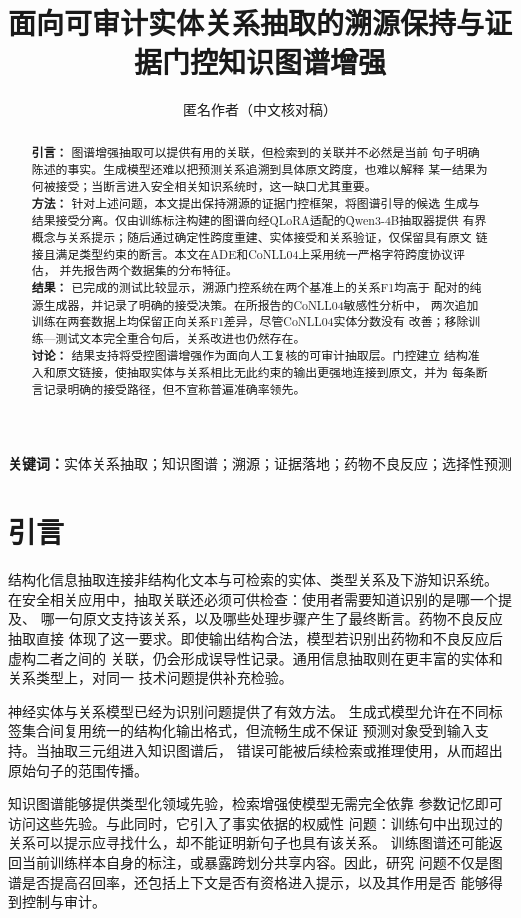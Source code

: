 \documentclass[12pt,a4paper,fontset=none]{ctexart}
\title{面向可审计实体关系抽取的溯源保持与证据门控知识图谱增强}
\author{匿名作者（中文核对稿）}
\date{}
\begin{document}
\maketitle
\begin{abstract}
\textbf{引言：} 图谱增强抽取可以提供有用的关联，但检索到的关联并不必然是当前
句子明确陈述的事实。生成模型还难以把预测关系追溯到具体原文跨度，也难以解释
某一结果为何被接受；当断言进入安全相关知识系统时，这一缺口尤其重要。\\
\textbf{方法：} 针对上述问题，本文提出保持溯源的证据门控框架，将图谱引导的候选
生成与结果接受分离。仅由训练标注构建的图谱向经QLoRA适配的Qwen3-4B抽取器提供
有界概念与关系提示；随后通过确定性跨度重建、实体接受和关系验证，仅保留具有原文
链接且满足类型约束的断言。本文在ADE和CoNLL04上采用统一严格字符跨度协议评估，
并先报告两个数据集的分布特征。\\
\textbf{结果：} 已完成的测试比较显示，溯源门控系统在两个基准上的关系F1均高于
配对的纯源生成器，并记录了明确的接受决策。在所报告的CoNLL04敏感性分析中，
两次追加训练在两套数据上均保留正向关系F1差异，尽管CoNLL04实体分数没有
改善；移除训练—测试文本完全重合句后，关系改进也仍然存在。\\
\textbf{讨论：} 结果支持将受控图谱增强作为面向人工复核的可审计抽取层。门控建立
结构准入和原文链接，使抽取实体与关系相比无此约束的输出更强地连接到原文，并为
每条断言记录明确的接受路径，但不宣称普遍准确率领先。
\end{abstract}
\noindent\textbf{关键词：}实体关系抽取；知识图谱；溯源；证据落地；药物不良反应；选择性预测

\section{引言}
\label{sec:introduction}
结构化信息抽取连接非结构化文本与可检索的实体、类型关系及下游知识系统。
在安全相关应用中，抽取关联还必须可供检查：使用者需要知道识别的是哪一个提及、
哪一句原文支持该关系，以及哪些处理步骤产生了最终断言。药物不良反应抽取直接
体现了这一要求。即使输出结构合法，模型若识别出药物和不良反应后虚构二者之间的
关联，仍会形成误导性记录。通用信息抽取则在更丰富的实体和关系类型上，对同一
技术问题提供补充检验。

神经实体与关系模型已经为识别问题提供了有效方法\cite{li2022ner,eberts2020spert}。
生成式模型允许在不同标签集合间复用统一的结构化输出格式，但流畅生成不保证
预测对象受到输入支持\cite{ji2023hallucination}。当抽取三元组进入知识图谱后，
错误可能被后续检索或推理使用，从而超出原始句子的范围传播。

知识图谱能够提供类型化领域先验\cite{hogan2021kg}，检索增强使模型无需完全依靠
参数记忆即可访问这些先验\cite{lewis2020rag}。与此同时，它引入了事实依据的权威性
问题：训练句中出现过的关系可以提示应寻找什么，却不能证明新句子也具有该关系。
训练图谱还可能返回当前训练样本自身的标注，或暴露跨划分共享内容。因此，研究
问题不仅是图谱是否提高召回率，还包括上下文是否有资格进入提示，以及其作用是否
能够得到控制与审计。
\end{document}
